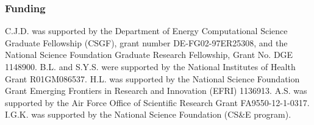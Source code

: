 \documentclass[twocolumn, 10pt]{article}
\begin{document}
\subsubsection*{Funding}
C.J.D. was supported by the Department of Energy Computational Science Graduate Fellowship (CSGF), grant number DE-FG02-97ER25308, and the National Science Foundation Graduate Research Fellowship, Grant No. DGE 1148900.
%
B.L. and S.Y.S. were supported by the National Institutes of Health Grant R01GM086537.
%
H.L. was supported by the National Science Foundation Grant Emerging Frontiers in Research and Innovation (EFRI) 1136913.
%
A.S. was supported by the Air Force Office of Scientific Research Grant
FA9550-12-1-0317.
%
I.G.K. was supported by the National Science Foundation (CS\&E program).




\end{document}

